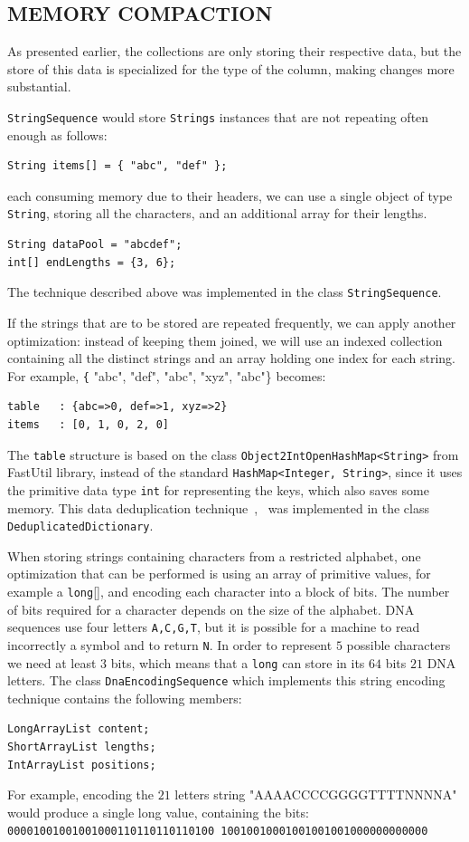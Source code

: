 \documentclass[a4paper,twoside]{article}
\begin{document}
\subsection{\uppercase{Memory Compaction}}
\label{subsec:compaction}


As presented earlier, the collections are only storing their respective data, but the store of this data is
specialized for the type of the column, making changes more substantial.

{\texttt{StringSequence}} would store {\texttt{Strings}} instances that are not repeating often enough as follows:
\begin{verbatim}
String items[] = { "abc", "def" };
\end{verbatim}
each consuming memory due to their headers, we can use 
a single object of type {\texttt{String}}, storing all the characters, and an additional array for their lengths.
\begin{verbatim}
String dataPool = "abcdef";
int[] endLengths = {3, 6};
\end{verbatim}
The technique described above was implemented in the class {\texttt{StringSequence}}.

If the strings that are to be stored are repeated frequently, we can apply another optimization:
instead of keeping them joined, we will use an indexed collection containing all the distinct strings and an array holding one index for each string.
For example, {\texttt{\{} "abc", "def", "abc", "xyz", "abc"\}} becomes:
\begin{verbatim}
table   : {abc=>0, def=>1, xyz=>2}
items   : [0, 1, 0, 2, 0]
\end{verbatim}
The {\texttt{table}} structure is based on the class {\texttt{Object2IntOpenHashMap<String>}} from FastUtil library, instead of the standard {\texttt{HashMap<Integer, String>}}, since it uses the primitive data type {\texttt{int}} for representing the keys, which also saves some memory.
This data deduplication technique~\cite{he:2010},~\cite{manogar:2014} was implemented in the class {\texttt{DeduplicatedDictionary}}.

When storing strings containing characters from a restricted alphabet, one optimization that can be performed is using an array of primitive values, for example a {\texttt{long}[]}, and encoding each character into a block of bits.
The number of bits required for a character depends on the size of the alphabet.
DNA sequences use four letters {\texttt{A,C,G,T}}, but it is possible for a machine to read incorrectly a symbol and to return {\texttt{N}}.
In order to represent $5$ possible characters we need at least $3$ bits,
which means that a {\texttt{long}} can store in its $64$ bits $21$ DNA letters.
The class {\texttt{DnaEncodingSequence}} which implements this string encoding technique contains the following members:
\begin{verbatim}
LongArrayList content;
ShortArrayList lengths;      
IntArrayList positions;     
\end{verbatim}
For example, encoding the $21$ letters string "AAAACCCCGGGGTTTTNNNNA" would produce a single long value, containing the bits:\\
{\texttt{00001001001001000110110110110100
		10010010001001001001000000000000}
}
\end{document}
